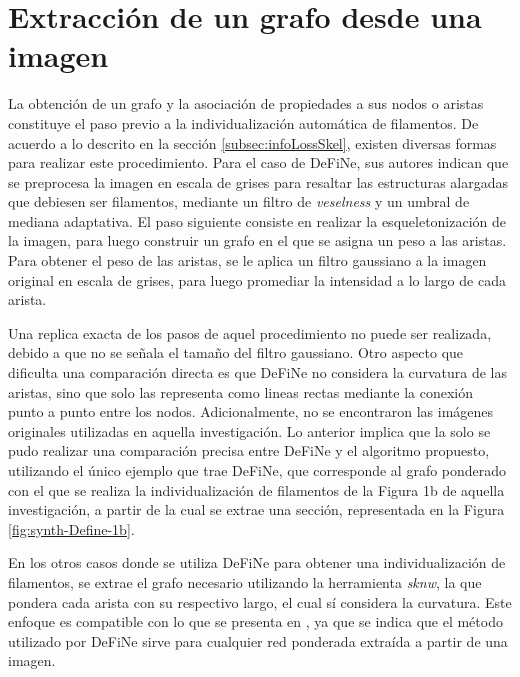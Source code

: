 \section{Extracci\'on de un grafo desde una imagen}
\label{sec:graphImageExtraction}
La obtenci\'on de un grafo y la asociaci\'on de propiedades a sus nodos o aristas constituye el paso previo a la individualizaci\'on autom\'atica de filamentos. De acuerdo a lo descrito en la secci\'on \ref{subsec:infoLossSkel}, existen diversas formas para realizar este procedimiento. Para el caso de DeFiNe, sus autores indican que se preprocesa la imagen en escala de grises para resaltar las estructuras alargadas que debiesen ser filamentos, mediante un filtro de {\it veselness} y un umbral de mediana adaptativa. El paso siguiente consiste en realizar la esqueletonizaci\'on de la imagen, para luego construir un grafo en el que se asigna un peso a las aristas. 
Para obtener el peso de las aristas, se le aplica un filtro gaussiano a la imagen original en escala de grises, para luego promediar la intensidad a lo largo de cada arista.


Una replica exacta de los pasos de aquel procedimiento no puede ser realizada, debido a que no se se\~nala el tama\~no del filtro gaussiano. Otro aspecto que dificulta una comparaci\'on directa es que DeFiNe no considera la curvatura de las aristas, sino que solo las representa como lineas rectas mediante la conexión punto a punto entre los nodos. Adicionalmente, no se encontraron las im\'agenes originales utilizadas en aquella investigaci\'on. Lo anterior implica que la solo se pudo realizar una comparaci\'on precisa entre DeFiNe y el algoritmo propuesto, utilizando el \'unico ejemplo que trae DeFiNe, que corresponde al grafo ponderado con el que se realiza la individualizaci\'on de filamentos de la Figura 1b de aquella investigaci\'on, a partir de la cual se extrae una secci\'on, representada en la Figura \ref{fig:synth-Define-1b}.


En los otros casos donde se utiliza DeFiNe para obtener una individualizaci\'on de filamentos, se extrae el grafo necesario utilizando la herramienta {\it sknw}, la que pondera cada arista con su respectivo largo, el cual s\'i considera la curvatura. Este enfoque es compatible con lo que se presenta en \cite{breuer2015define}, ya que se indica que el m\'etodo utilizado por DeFiNe sirve para cualquier red ponderada extra\'ida a partir de una imagen.


